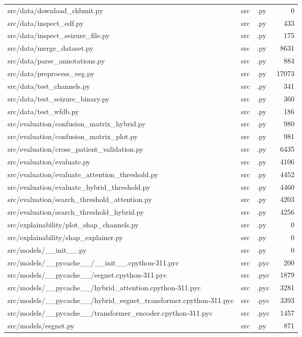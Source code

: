 \begin{tabular}{lllr}
src/data/download\_chbmit.py & src & .py & 0 \\
src/data/inspect\_edf.py & src & .py & 433 \\
src/data/inspect\_seizure\_file.py & src & .py & 175 \\
src/data/merge\_dataset.py & src & .py & 8631 \\
src/data/parse\_annotations.py & src & .py & 884 \\
src/data/preprocess\_eeg.py & src & .py & 17073 \\
src/data/test\_channels.py & src & .py & 341 \\
src/data/test\_seizure\_binary.py & src & .py & 360 \\
src/data/test\_wfdb.py & src & .py & 186 \\
src/evaluation/confusion\_matrix\_hybrid.py & src & .py & 980 \\
src/evaluation/confusion\_matrix\_plot.py & src & .py & 981 \\
src/evaluation/cross\_patient\_validation.py & src & .py & 6435 \\
src/evaluation/evaluate.py & src & .py & 4106 \\
src/evaluation/evaluate\_attention\_threshold.py & src & .py & 4452 \\
src/evaluation/evaluate\_hybrid\_threshold.py & src & .py & 4460 \\
src/evaluation/search\_threshold\_attention.py & src & .py & 4203 \\
src/evaluation/search\_threshold\_hybrid.py & src & .py & 4256 \\
src/explainability/plot\_shap\_channels.py & src & .py & 0 \\
src/explainability/shap\_explainer.py & src & .py & 0 \\
src/models/\_\_init\_\_.py & src & .py & 0 \\
src/models/\_\_pycache\_\_/\_\_init\_\_.cpython-311.pyc & src & .pyc & 200 \\
src/models/\_\_pycache\_\_/eegnet.cpython-311.pyc & src & .pyc & 1879 \\
src/models/\_\_pycache\_\_/hybrid\_attention.cpython-311.pyc & src & .pyc & 3281 \\
src/models/\_\_pycache\_\_/hybrid\_eegnet\_transformer.cpython-311.pyc & src & .pyc & 3393 \\
src/models/\_\_pycache\_\_/transformer\_encoder.cpython-311.pyc & src & .pyc & 1457 \\
src/models/eegnet.py & src & .py & 871 \\

\end{tabular}
